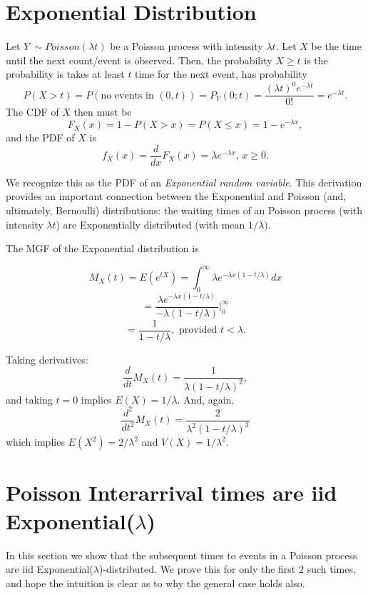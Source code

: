 \documentclass[
]{book}
\begin{document}
\hypertarget{exponential-distribution}{%
\section{Exponential Distribution}\label{exponential-distribution}}

Let \(Y~\sim Poisson(\lambda t)\) be a Poisson process with intensity \(\lambda t\). Let \(X\) be the time until the next count/event is observed. Then, the probability \(X \geq t\) is the probability is takes at least \(t\) time for the next event, has probability
\[P(X > t) = P(\text{no events in }(0,t)) = P_Y(0;t) = \frac{(\lambda t)^0 e^{-\lambda t}}{0!} = e^{-\lambda t}.\]
The CDF of \(X\) then must be
\[F_X(x) = 1-P(X > x) = P(X\leq x) = 1-e^{-\lambda x},\]
and the PDF of \(X\) is
\[f_X(x) = \frac{d}{dx}F_X(x) = \lambda e^{-\lambda x}, \, x\geq 0.\]

We recognize this as the PDF of an \emph{Exponential random variable}. This derivation provides an important connection between the Exponential and Poisson (and, ultimately, Bernoulli) distributions: the waiting times of an Poisson process (with intensity \(\lambda t\)) are Exponentially distributed (with mean \(1/\lambda\)).

The MGF of the Exponential distribution is

\[M_X(t) = E(e^{tX})  = \int_{0}^\infty \lambda e^{-\lambda x(1-t/\lambda)}dx\]
\[ = \frac{\lambda e^{-\lambda x(1-t/\lambda)}}{-\lambda (1-t/\lambda)}|_0^\infty\]
\[ = \frac{1}{1-t/\lambda}, \text{ provided }t < \lambda.\]

Taking derivatives:
\[\frac{d}{dt}M_X(t) = \frac{1}{\lambda(1-t/\lambda)^2}, \]
and taking \(t = 0\) implies \(E(X) = 1/\lambda\).
And, again,
\[\frac{d^2}{dt^2}M_X(t) = \frac{2}{\lambda^2(1-t/\lambda)^3}\]
which implies \(E(X^2) = 2/\lambda^2\) and \(V(X) = 1/\lambda^2\).

\hypertarget{poisson-interarrival-times-are-iid-exponentiallambda}{%
\section{\texorpdfstring{Poisson Interarrival times are iid Exponential(\(\lambda\))}{Poisson Interarrival times are iid Exponential(\textbackslash lambda)}}\label{poisson-interarrival-times-are-iid-exponentiallambda}}

In this section we show that the subsequent times to events in a Poisson process are iid Exponential(\(\lambda\))-distributed. We prove this for only the first \(2\) such times, and hope the intuition is clear as to why the general case holds also.
\end{document}
